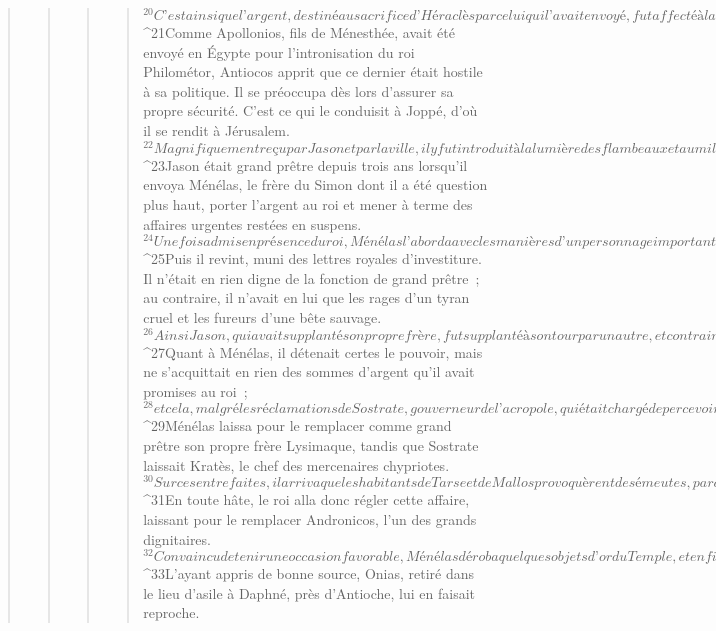 \begin{verse}
\begin{verse}
\begin{verse}
\begin{verse}
${}^{20}C’est ainsi que l’argent, destiné au sacrifice d’Héraclès par celui qui l’avait envoyé, fut affecté à la construction de navires, après l’intervention de ceux qui l’apportaient.
${}^{21}Comme Apollonios, fils de Ménesthée, avait été envoyé en Égypte pour l’intronisation du roi Philométor, Antiocos apprit que ce dernier était hostile à sa politique. Il se préoccupa dès lors d’assurer sa propre sécurité. C’est ce qui le conduisit à Joppé, d’où il se rendit à Jérusalem. 
${}^{22}Magnifiquement reçu par Jason et par la ville, il y fut introduit à la lumière des flambeaux et au milieu des acclamations. Après quoi, il partit installer en Phénicie le camp de son armée.
${}^{23}Jason était grand prêtre depuis trois ans lorsqu’il envoya Ménélas, le frère du Simon dont il a été question plus haut, porter l’argent au roi et mener à terme des affaires urgentes restées en suspens. 
${}^{24}Une fois admis en présence du roi, Ménélas l’aborda avec les manières d’un personnage important et se fit attribuer à lui-même la fonction de grand prêtre, en offrant trois cents talents de plus que n’avait offerts Jason. 
${}^{25}Puis il revint, muni des lettres royales d’investiture. Il n’était en rien digne de la fonction de grand prêtre ; au contraire, il n’avait en lui que les rages d’un tyran cruel et les fureurs d’une bête sauvage. 
${}^{26}Ainsi Jason, qui avait supplanté son propre frère, fut supplanté à son tour par un autre, et contraint de gagner en fugitif le pays des Ammonites. 
${}^{27}Quant à Ménélas, il détenait certes le pouvoir, mais ne s’acquittait en rien des sommes d’argent qu’il avait promises au roi ; 
${}^{28}et cela, malgré les réclamations de Sostrate, gouverneur de l’acropole, qui était chargé de percevoir les impôts. Pour cette raison, ils furent tous deux convoqués par le roi. 
${}^{29}Ménélas laissa pour le remplacer comme grand prêtre son propre frère Lysimaque, tandis que Sostrate laissait Kratès, le chef des mercenaires chypriotes.
${}^{30}Sur ces entrefaites, il arriva que les habitants de Tarse et de Mallos provoquèrent des émeutes, parce que leurs villes avaient été données en présent à Antiochis, la concubine du roi. 
${}^{31}En toute hâte, le roi alla donc régler cette affaire, laissant pour le remplacer Andronicos, l’un des grands dignitaires. 
${}^{32}Convaincu de tenir une occasion favorable, Ménélas déroba quelques objets d’or du Temple, et en fit cadeau à Andronicos ; il parvint également à en vendre d’autres à Tyr et aux villes voisines. 
${}^{33}L’ayant appris de bonne source, Onias, retiré dans le lieu d’asile à Daphné, près d’Antioche, lui en faisait reproche. 

\end{verse}
\end{verse}
\end{verse}
\end{verse}
